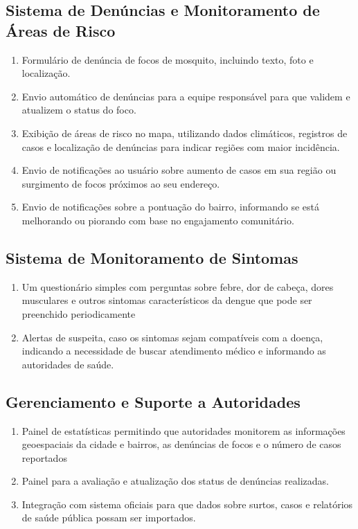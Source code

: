 \documentclass[a5paper, 12pt]{article}
\begin{document}
\subsection{Sistema de Denúncias e Monitoramento de Áreas de Risco}
\begin{enumerate}
    \item Formulário de denúncia de focos de mosquito, incluindo texto, foto e localização.
    \item Envio automático de denúncias para a equipe responsável para que validem e atualizem o status do foco. 
    \item Exibição de áreas de risco no mapa, utilizando dados climáticos, registros de casos e localização de denúncias para indicar regiões com maior incidência.
    \item Envio de notificações ao usuário sobre aumento de casos em sua região ou surgimento de focos próximos ao seu endereço.
    \item Envio de notificações sobre a pontuação do bairro, informando se está melhorando ou piorando com base no engajamento comunitário.
\end{enumerate}

\subsection{Sistema de Monitoramento de Sintomas}
\begin{enumerate}
    \item Um questionário simples com perguntas sobre febre, dor de cabeça, dores musculares e outros sintomas característicos da dengue que pode ser preenchido periodicamente
    \item Alertas de suspeita, caso os sintomas sejam compatíveis com a doença, indicando a necessidade de buscar atendimento médico e informando as autoridades de saúde.
\end{enumerate}
\subsection{Gerenciamento e Suporte a Autoridades}
\begin{enumerate}
    \item Painel de estatísticas permitindo que autoridades monitorem as informações geoespaciais da cidade e bairros, as denúncias de focos e o número de casos  reportados
    \item Painel para a avaliação e atualização dos status de denúncias realizadas.
    \item Integração com sistema oficiais para que dados sobre surtos, casos e relatórios de saúde pública possam ser importados.
\end{enumerate}
\end{document}
